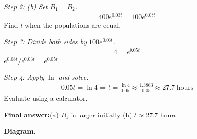 \documentclass[11pt]{article}
\begin{document}
\textit{Step 2: (b) Set \( B_1 = B_2 \).}
\[\begin{gathered}
400e^{0.03t} = 100e^{0.08t}
\end{gathered}\]
Find \( t \) when the populations are equal.

\textit{Step 3: Divide both sides by \( 100e^{0.03t} \).}
\[\begin{gathered}
4 = e^{0.05t}
\end{gathered}\]
\( e^{0.08t}/e^{0.03t} = e^{0.05t} \).

\textit{Step 4: Apply \( \ln \) and solve.}
\[\begin{gathered}
0.05t = \ln 4 \Rightarrow t = \frac{\ln 4}{0.05} \approx \frac{1.3863}{0.05} \approx 27.7 \text{ hours}
\end{gathered}\]
Evaluate using a calculator.

\begin{answerbox}
\textbf{Final answer:}\quad (a) \(\displaystyle  B_1 \) is larger initially \quad  (b) \(\displaystyle  t \approx 27.7 \) hours
\end{answerbox}
\textbf{Diagram.}
\end{document}
